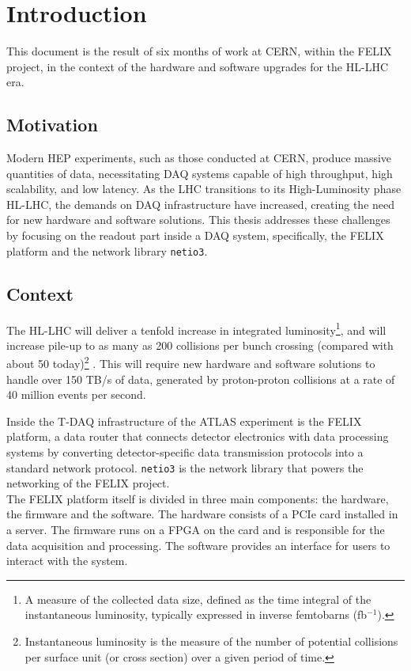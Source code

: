 \chapter{Introduction}

This document is the result of six months of work at \acs{CERN}, within the \acs{FELIX} project, in the context of the hardware and software upgrades for the \acl{HL-LHC} era.

\section{Motivation}

Modern \acl{HEP} experiments, such as those conducted at \acf{CERN}, produce massive quantities of data, necessitating \acf{DAQ} systems capable of high throughput, high scalability, and low latency. As the \acf{LHC} transitions to its High-Luminosity phase \acs{HL-LHC}, the demands on \acs{DAQ} infrastructure have increased, creating the need for new hardware and software solutions. This thesis addresses these challenges by focusing on the readout part inside a \acl{DAQ} system, specifically, the \acs{FELIX} platform and the network library \texttt{netio3}.

\section{Context}

The \acs{HL-LHC} will deliver a tenfold increase in integrated luminosity\footnote{A measure of the collected data size, defined as the time integral of the instantaneous luminosity, typically expressed in inverse femtobarns (fb\(^{-1}\)).}, and will increase pile-up to as many as 200 collisions per bunch crossing (compared with about 50 today)\footnote{Instantaneous luminosity is the measure of the number of potential collisions per surface unit (or cross section) over a given period of time.} \cite{HighLumiLHC}. This will require new hardware and software solutions to handle over 150 TB/s of data, generated by proton-proton collisions at a rate of 40 million events per second.

Inside the \acl{T-DAQ} infrastructure of the \acs{ATLAS} experiment is the \acs{FELIX} platform, a data router that connects detector electronics with data processing systems by converting detector-specific data transmission protocols into a standard network protocol.
\texttt{netio3} is the network library that powers the networking of the \acs{FELIX} project.\\
The \acs{FELIX} platform itself is divided in three main components: the hardware, the firmware and the software. The hardware consists of a \acs{PCIe} card installed in a server. The firmware runs on a \acs{FPGA} on the card and is responsible for the data acquisition and processing. The software provides an interface for users to interact with the system.

